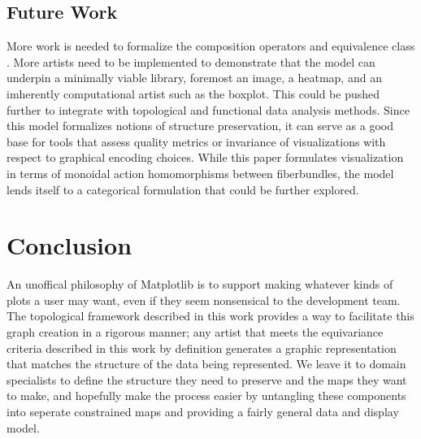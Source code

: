\documentclass[journal]{vgtc}                %
\begin{document}
\subsection{Future Work}
More work is needed to formalize the composition operators and equivalence class \vartisteq.  More artists need to be implemented to demonstrate that the model can underpin a minimally viable library,  foremost an image\cite{toryRethinkingVisualizationHighlevel2004, haber1990visualization,hansen2011visualization}, a heatmap\cite{wilkinsonHistoryClusterHeat2009,loua1873atlas}, and an imherently computational artist such as the boxplot\cite{wickham40YearsBoxplots2011}. This could be pushed further to integrate with topological\cite{heineSurveyTopologybasedMethods2016} and functional \cite{ramsayFunctionalDataAnalysis2006a} data analysis methods. Since this model formalizes notions of structure preservation, it can serve as a good base for tools that assess quality metrics\cite{bertiniQualityMetricsHighdimensional2011a} or invariance \cite{kindlmannAlgebraicProcessVisualization2014} of visualizations with respect to graphical encoding choices. While this paper formulates visualization in terms of monoidal action homomorphisms between fiberbundles, the model lends itself to a categorical formulation\cite{fongInvitationAppliedCategory2019,milewskiCategoryTheoryProgrammers} that could be further explored. 
\section{Conclusion}
An unoffical philosophy of Matplotlib is to support making whatever kinds of plots a user may want, even if they seem nonsensical to the development team. The topological framework described in this work provides a way to facilitate this graph creation in a rigorous manner; any artist that meets the equivariance criteria described in this work by definition generates a graphic representation that matches the structure of the data being represented. We leave it to domain specialists to define the structure they need to preserve and the maps they want to make, and hopefully make the process easier by untangling these components into seperate constrained maps and providing a fairly general data and display model. 


%

%
%
%

\end{document}
